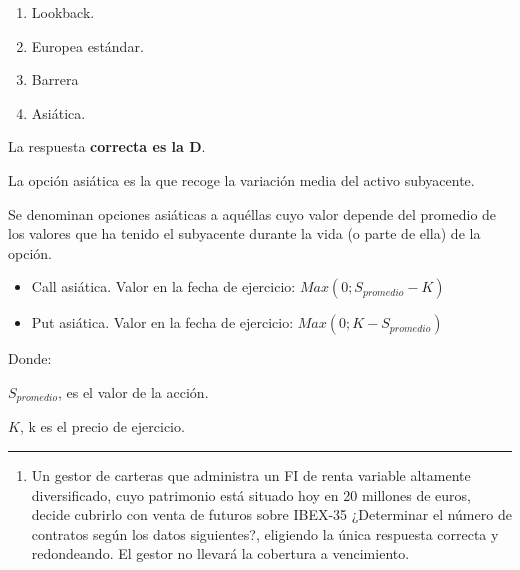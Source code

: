 \documentclass[
  letterpaper,
  DIV=11,
  numbers=noendperiod]{scrreprt}
\providecommand{\tightlist}{%
  \setlength{\itemsep}{0pt}\setlength{\parskip}{0pt}}\usepackage{longtable,booktabs,array}
\begin{document}
\begin{enumerate}
\def\labelenumi{\alph{enumi})}
\item
  Lookback.
\item
  Europea estándar.
\item
  Barrera
\item
  Asiática.
\end{enumerate}

\begin{tcolorbox}[enhanced jigsaw, left=2mm, opacityback=0, colback=white, breakable, arc=.35mm, bottomrule=.15mm, rightrule=.15mm, toprule=.15mm, leftrule=.75mm, colframe=quarto-callout-tip-color-frame]
\begin{minipage}[t]{5.5mm}
\textcolor{quarto-callout-tip-color}{\faLightbulb}
\end{minipage}%
\begin{minipage}[t]{\textwidth - 5.5mm}

La respuesta \textbf{correcta es la D}.

La opción asiática es la que recoge la variación media del activo
subyacente.

Se denominan opciones asiáticas a aquéllas cuyo valor depende del
promedio de los valores que ha tenido el subyacente durante la vida (o
parte de ella) de la opción.

\begin{itemize}
\item
  Call asiática. Valor en la fecha de ejercicio:
  \(Max (0; S_{promedio}- K)\)
\item
  Put asiática. Valor en la fecha de ejercicio:
  \(Max (0; K - S_ {promedio} )\)
\end{itemize}

Donde:

\(S_{promedio}\), es el valor de la acción.

\(K\), k es el precio de ejercicio.

\end{minipage}%
\end{tcolorbox}

\begin{center}\rule{0.5\linewidth}{0.5pt}\end{center}

\begin{enumerate}
\def\labelenumi{\arabic{enumi}.}
\setcounter{enumi}{27}
\tightlist
\item
  Un gestor de carteras que administra un FI de renta variable altamente
  diversificado, cuyo patrimonio está situado hoy en 20 millones de
  euros, decide cubrirlo con venta de futuros sobre IBEX-35 ¿Determinar
  el número de contratos según los datos siguientes?, eligiendo la única
  respuesta correcta y redondeando. El gestor no llevará la cobertura a
  vencimiento.
\end{enumerate}
\end{document}
